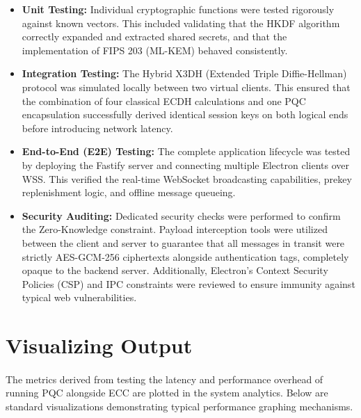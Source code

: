 \begin{itemize}
    \item \textbf{Unit Testing:} Individual cryptographic functions were tested rigorously against known vectors. This included validating that the HKDF algorithm correctly expanded and extracted shared secrets, and that the implementation of FIPS 203 (ML-KEM) behaved consistently.
    \item \textbf{Integration Testing:} The Hybrid X3DH (Extended Triple Diffie-Hellman) protocol was simulated locally between two virtual clients. This ensured that the combination of four classical ECDH calculations and one PQC encapsulation successfully derived identical session keys on both logical ends before introducing network latency.
    \item \textbf{End-to-End (E2E) Testing:} The complete application lifecycle was tested by deploying the Fastify server and connecting multiple Electron clients over WSS. This verified the real-time WebSocket broadcasting capabilities, prekey replenishment logic, and offline message queueing.
    \item \textbf{Security Auditing:} Dedicated security checks were performed to confirm the Zero-Knowledge constraint. Payload interception tools were utilized between the client and server to guarantee that all messages in transit were strictly AES-GCM-256 ciphertexts alongside authentication tags, completely opaque to the backend server. Additionally, Electron's Context Security Policies (CSP) and IPC constraints were reviewed to ensure immunity against typical web vulnerabilities.
\end{itemize}

\section{Visualizing Output}
\paragraph{}
The metrics derived from testing the latency and performance overhead of running PQC alongside ECC are plotted in the system analytics. Below are standard visualizations demonstrating typical performance graphing mechanisms.

